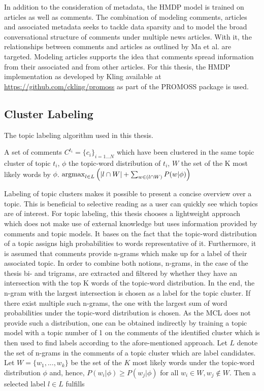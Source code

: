 In addition to the consideration of metadata, the HMDP model is trained on articles as well as comments. The combination of modeling comments, articles and associated metadata seeks to tackle data sparsity and to model the broad conversational structure of comments under multiple news articles. With it, the relationships between comments and articles as outlined by Ma et al. \cite{DBLP:conf/cikm/MaSYC12} are targeted. Modeling articles supports the idea that comments spread information from their associated and from other articles.
For this thesis, the HMDP implementation as developed by Kling \cite{DBLP:phd/dnb/Kling16} available at \url{https://github.com/ckling/promoss} as part of the PROMOSS package is used.

\subsection{Cluster Labeling}
\label{labeling}
\begin{algorithm}[H]
\caption{The topic labeling algorithm used in this thesis.}
\begin{algorithmic}
\REQUIRE A set of comments $C^{t_i} = \{c_i\}_{i=1...N}$ which have been clustered in the same topic cluster of topic $t_i$, $\phi$ the topic-word distribution of $t_i$, $W$ the set of the K most likely words by $\phi$.
\ENDFOR
\RETURN $\operatorname*{argmax}_{l \in L} \left( |l \cap W| + \sum_{w \in (l \cap W)} P(w|\phi) \right)$
\end{algorithmic}
\end{algorithm}
Labeling of topic clusters makes it possible to present a concise overview over a topic. This is beneficial to selective reading as a user can quickly see which topics are of interest. For topic labeling, this thesis chooses a lightweight approach which does not make use of external knowledge but uses information provided by comments and topic models.
It bases on the fact that the topic-word distribution of a topic assigns high probabilities to words representative of it. Furthermore, it is assumed that comments provide n-grams which make up for a label of their associated topic. In order to combine both notions, n-grams, in the case of the thesis bi- and trigrams, are extracted and filtered by whether they have an intersection with the top K words of the topic-word distribution. In the end, the n-gram with the largest intersection is chosen as a label for the topic cluster. If there exist multiple such n-grams, the one with the largest sum of word probabilities under the topic-word distribution is chosen. As the MCL does not provide such a distribution, one can be obtained indirectly by training a topic model with a topic number of 1 on the comments of the identified cluster which is then used to find labels according to the afore-mentioned approach. Let $L$ denote the set of n-grams in the comments of a topic cluster which are label candidates. Let $W = \{w_1,...,w_{k}\}$ be the set of the $K$ most likely words under the topic-word distribution $\phi$ and, hence, $P(w_i|\phi) \geq P(w_j|\phi)$ for all $w_i \in W, w_j \notin W$. Then a selected label $l \in L$ fulfills 
